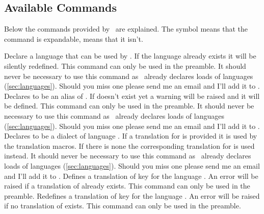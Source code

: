 \documentclass[DIV11,toc=index,toc=bib,numbers=noendperiod]{cnpkgdoc}
\newcommand*\unexpsign{{\tiny\FiveStar}}
\newcommand*\expsign{\textcolor{red}{{\tiny\FiveStar}}}
\begin{document}
\subsection{Available Commands}\label{ssec:commands}
Below the commands provided by \translations\ are explained.  The symbol
\expsign{} means that the command is expandable, \unexpsign{} means that it
isn't.
\begin{beschreibung}
 \newline
   Declare a language that can be used by \translations.  If the language
   already exists it will be silently redefined.  This command can only be
   used in the preamble.  It should never be necessary to use this command as
   \translations\ already declares loads of languages (\cref{sec:languages}).
   Should you miss one please send me an email and I'll add it to
   \translations.
 \newline
   Declares  to be an alias of .  If 
   doesn't exist yet a warning will be raised and it will be defined.  This
   command can only be used in the preamble.  It should never be necessary to
   use this command as \translations\ already declares loads of languages
   (\cref{sec:languages}).  Should you miss one please send me an email and
   I'll add it to \translations.
 \newline
   Declares  to be a dialect of language .  If a
   translation for  is provided it is used by the translation
   macros.  If there is none the corresponding translation for 
   is used instead.  It should never be necessary to use this command as
   \translations\ already declares loads of languages (\cref{sec:languages}).
   Should you miss one please send me an email and I'll add it to
   \translations.
 \newline
   Defines a translation of key  for the language .
   An error will be raised if a translation of  already exists.
   This command can only be used in the preamble.
 \newline
   Redefines a translation of key  for the language .
   An error will be raised if no translation of  exists.
   This command can only be used in the preamble.

\end{beschreibung}
\end{document}
